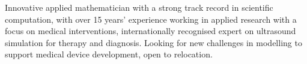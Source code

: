 \documentclass[english, print]{cv-style-wide}
\begin{document}

%
\setul{0.5ex}{0.4pt}%
Innovative applied mathematician with a strong track record in {scientific computation}, with over 15 years' experience working in applied research with a focus on medical interventions, internationally recognised expert on ultrasound simulation for therapy and diagnosis. Looking for new challenges in modelling to support medical device development, open to relocation.
\end{document}
